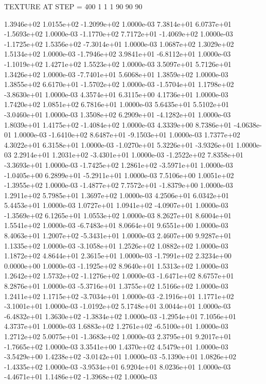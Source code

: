 TEXTURE AT STEP = 400
1 1 1
90 90 90

 1.3946e+02  1.0155e+02 -1.2099e+02  1.0000e-03
 7.3814e+01  6.0737e+01 -1.5693e+02  1.0000e-03
-1.1770e+02  7.7172e+01 -1.4069e+02  1.0000e-03
-1.1725e+02  1.5356e+02 -7.3014e+01  1.0000e-03
1.0687e+02 1.3029e+02 1.5134e+02  1.0000e-03
-1.7946e+02  3.9841e+01 -6.8112e+01  1.0000e-03
-1.1019e+02  1.4271e+02  1.5523e+02  1.0000e-03
3.5097e+01 5.7126e+01 1.3426e+02  1.0000e-03
-7.7401e+01  5.6068e+01  1.3859e+02  1.0000e-03
 1.3855e+02  6.6170e+01 -1.5702e+02  1.0000e-03
-1.5704e+01  1.1798e+02 -3.8630e+01  1.0000e-03
4.3574e+01 6.3115e+00 4.1736e+01  1.0000e-03
1.7420e+02 1.0851e+02 6.7816e+01  1.0000e-03
 5.6435e+01  5.5102e+01 -3.0460e+01  1.0000e-03
 1.3508e+02  6.2909e+01 -4.1282e+01  1.0000e-03
 1.8039e+01  1.4175e+02 -1.4084e+02  1.0000e-03
 4.3339e+00  8.7386e+01 -4.0638e-01  1.0000e-03
-1.6410e+02  8.6487e+01 -9.1503e+01  1.0000e-03
1.7377e+02 4.3022e+01 6.3158e+01  1.0000e-03
-1.0270e+01  5.3226e+01 -3.9326e+01  1.0000e-03
 2.2914e+01  1.2031e+02 -3.4301e+01  1.0000e-03
-1.2522e+02  7.8358e+01 -3.3693e+01  1.0000e-03
-1.7425e+02  1.2861e+02 -3.5971e+01  1.0000e-03
-1.0405e+00  6.2899e+01 -5.2911e+01  1.0000e-03
 7.5106e+00  1.0051e+02 -1.3955e+02  1.0000e-03
-1.4877e+02  7.7572e+01 -1.8379e+00  1.0000e-03
1.2911e+02 5.7985e+01 1.3697e+02  1.0000e-03
4.2506e+01 6.0342e+01 5.4453e+01  1.0000e-03
 1.0727e+01  1.0941e+02 -4.0907e+01  1.0000e-03
-1.3569e+02  6.1265e+01  1.0553e+02  1.0000e-03
8.2627e+01 8.6004e+01 1.5541e+02  1.0000e-03
-6.7483e+01  8.0664e+01  9.6551e+00  1.0000e-03
 8.4063e+01  1.2007e+02 -5.3431e+01  1.0000e-03
2.4607e+00 9.9287e+01 1.1335e+02  1.0000e-03
-3.1058e+01  1.2526e+02  1.0882e+02  1.0000e-03
1.1872e+02 4.8644e+01 2.3615e+01  1.0000e-03
-1.7991e+02  2.3234e+00  0.0000e+00  1.0000e-03
-1.1925e+02  8.9640e+01  1.5313e+02  1.0000e-03
 1.2642e+02  1.5732e+02 -1.1276e+02  1.0000e-03
-1.6471e+02  8.6757e+01  8.2876e+01  1.0000e-03
-5.3716e+01  1.3755e+02  1.5166e+02  1.0000e-03
 1.2411e+02  1.1715e+02 -3.7034e+01  1.0000e-03
-2.1916e+01  1.1771e+02 -3.1001e+01  1.0000e-03
-1.0192e+02  5.1748e+01  3.0044e+01  1.0000e-03
-6.4832e+01  1.3630e+02 -1.3834e+02  1.0000e-03
-1.2954e+01  7.1056e+01  4.3737e+01  1.0000e-03
 1.6883e+02  1.2761e+02 -6.5100e+01  1.0000e-03
 1.2712e+02  5.0075e+01 -1.3683e+02  1.0000e-03
 2.3795e+01  9.2017e+01 -1.7665e+02  1.0000e-03
3.3541e+00 1.4370e+02 4.5479e+01  1.0000e-03
-3.5429e+00  1.4238e+02 -3.0142e+01  1.0000e-03
-5.1390e+01  1.0826e+02 -1.4335e+02  1.0000e-03
-3.9534e+01  6.9204e+01  8.0236e+01  1.0000e-03
-4.4671e+01  1.1486e+02 -1.3968e+02  1.0000e-03
